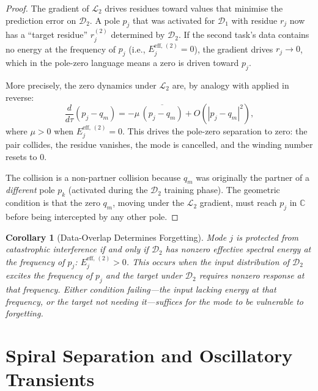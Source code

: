 \documentclass[11pt,a4paper]{article}
\newtheorem{corollary}[theorem]{Corollary}
\theoremstyle{definition}
\newcommand{\C}{\mathbb{C}}
\newcommand{\cL}{\mathcal{L}}
\newcommand{\cD}{\mathcal{D}}
\begin{document}
\begin{proof}
The gradient of $\cL_2$ drives residues toward values that
minimise the prediction error on $\cD_2$. A pole $p_j$ that was
activated for $\cD_1$ with residue $r_j$ now has a
``target residue'' $r_j^{(2)}$ determined by $\cD_2$. If the
second task's data contains no energy at the frequency of $p_j$
(i.e., $E_j^{\mathrm{eff},\,(2)} = 0$), the gradient drives
$r_j \to 0$, which in the pole-zero language means a zero is
driven toward $p_j$.

More precisely, the zero dynamics under $\cL_2$ are, by analogy
with  applied in reverse:
\[
  \frac{d}{d\tau}(p_j - q_m)
  = -\mu\,\overline{(p_j - q_m)} + O(|p_j-q_m|^2),
\]
where $\mu > 0$ when $E_j^{\mathrm{eff},\,(2)} = 0$.
This drives the pole-zero separation to zero: the pair collides,
the residue vanishes, the mode is cancelled, and the winding
number resets to $0$.

The collision is a non-partner collision because $q_m$ was
originally the partner of a \emph{different} pole $p_k$
(activated during the $\cD_2$ training phase). The geometric
condition is that the zero $q_m$, moving under the $\cL_2$
gradient, must reach $p_j$ in $\C$ before being intercepted by
any other pole.
\end{proof}

\begin{corollary}[Data-Overlap Determines Forgetting]%
\label{cor:forgetting}
Mode $j$ is protected from catastrophic interference if and only
if $\cD_2$ has nonzero effective spectral energy at the frequency
of $p_j$:
$E_j^{\mathrm{eff},\,(2)} > 0$.
This occurs when the input distribution of $\cD_2$ excites the
frequency of $p_j$ \emph{and} the target under $\cD_2$ requires
nonzero response at that frequency. Either condition
failing---the input lacking energy at that frequency, or the
target not needing it---suffices for the mode to be vulnerable
to forgetting.
\end{corollary}

\section{Spiral Separation and Oscillatory Transients}%
\label{sec:spiral}
\end{document}
